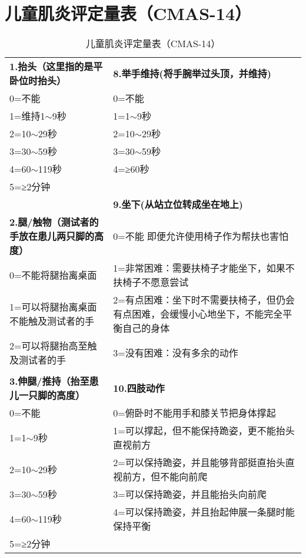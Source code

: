 \appendix



\section{儿童肌炎评定量表（CMAS-14）} \label{appendix_cmas}

\begin{table}[h]
\centering
\caption{儿童肌炎评定量表（CMAS-14）}
\label{cmas_14}
\begin{tabular}{|p{}||p{}|}
\hline
\textbf{1.抬头（这里指的是平卧位时抬头）} & \textbf{8.举手维持(将手腕举过头顶，并维持)}\\ \cline{1-2}
0=不能 & 0=不能  \\
1=维持1$\sim$9秒  & 1=1$\sim$9秒\\
2=10$\sim$29秒  & 2=10$\sim$29秒  \\
3=30$\sim$59秒  & 3=30$\sim$59秒  \\
4=60$\sim$119秒 & 4=≥60秒\\
5=≥2分钟    &       \\ \cline{2-2}
      & \cellcolor{LightCyan} \textbf{9.坐下(从站立位转成坐在地上)}   \\ \cline{1-2}
\textbf{2.腿/触物（测试者的手放在患儿两只脚的高度）}               & 0=不能   即便允许使用椅子作为帮扶也害怕     \\ \cline{1-1}
0=不能将腿抬离桌面 & 1=非常困难：需要扶椅子才能坐下，如果不扶椅子不愿意尝试 \\
1=可以将腿抬离桌面不能触及测试者的手 & 2=有点困难：坐下时不需要扶椅子，但仍会有点困难，会缓慢小心地坐下，不能完全平衡自己的身体 \\
2=可以将腿抬高至触及测试者的手 & 3=没有困难：没有多余的动作             \\
      &       \\ \cline{1-2}
\textbf{3.伸腿/推持（抬至患儿一只脚的高度）}  & \textbf{10.四肢动作}   \\ \cline{1-2}
0=不能  & 0=俯卧时不能用手和膝关节把身体撑起         \\
1=1$\sim$9秒& 1=可以撑起，但不能保持跪姿，更不能抬头直视前方   \\
2=10$\sim$29秒  & 2=可以保持跪姿，并且能够背部挺直抬头直视前方，但不能向前爬 \\
3=30$\sim$59秒  & 3=可以保持跪姿，并且能抬头向前爬          \\
4=60$\sim$119秒 & 4=可以保持跪姿，并且抬起伸展一条腿时能保持平衡   \\
5=≥2分钟&       \\ \cline{2-2}

\end{tabular}
\end{table}
